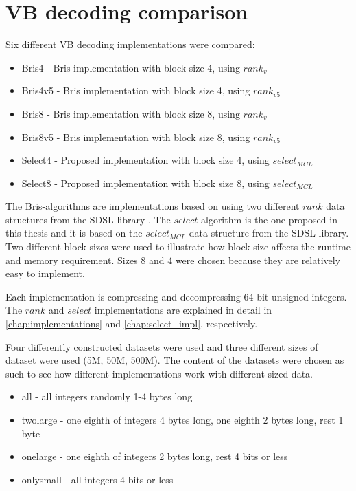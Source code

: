 \section{VB decoding comparison}
Six different VB decoding implementations were compared:
\begin{itemize}
  \item Bris4 - Bris implementation with block size 4, using $rank_v$
  \item Bris4v5 - Bris implementation with block size 4, using $rank_{v5}$
  \item Bris8 - Bris implementation with block size 8, using $rank_v$
  \item Bris8v5 - Bris implementation with block size 8, using $rank_{v5}$
  \item Select4 - Proposed implementation with block size 4, using $select_{MCL}$
  \item Select8 - Proposed implementation with block size 8, using $select_{MCL}$
\end{itemize}

The Bris-algorithms are implementations based on \citep{Bri09} using two different $rank$ data structures from the SDSL-library \citep{gbmp2014sea}. The $select$-algorithm is the one proposed in 
this thesis and it is based on the $select_{MCL}$ data structure from the SDSL-library. Two different block sizes were used to illustrate how block size affects the runtime and memory requirement. Sizes 
8 and 4 were chosen because they are relatively easy to implement. 

Each implementation is compressing and decompressing 64-bit unsigned integers. The $rank$ and $select$ implementations are explained in detail in \autoref{chap:implementations} 
and \autoref{chap:select_impl}, respectively. 

Four differently constructed datasets were used and three different sizes of dataset were used (5M, 50M, 500M). The content of the datasets were chosen as such to see how different implementations 
work with different sized data.

\begin{itemize}
  \item all - all integers randomly 1-4 bytes long
  \item twolarge - one eighth of integers 4 bytes long, one eighth 2 bytes long, rest 1 byte    
  \item onelarge - one eighth of integers 2 bytes long, rest 4 bits or less
  \item onlysmall - all integers 4 bits or less
\end{itemize}

